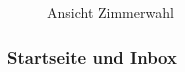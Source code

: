 \begin{figure}[h]
\begin{minipage}[b]{0.45\textwidth}
        \caption{Ansicht Zimmerwahl }
    \end{minipage}

    \label{fig:MobileClient-Screens1}

\end{figure}

\clearpage

\subsubsection*{Startseite und Inbox}

